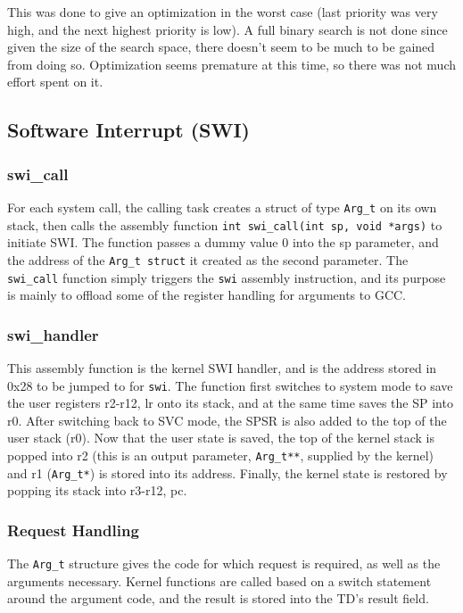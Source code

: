 \documentclass[12pt]{article}
\begin{document}
This was done to give an optimization in the worst case (last priority was very high, and the next highest priority is low). A full binary search is not done since given the size of the search space, there doesn’t seem to be much to be gained from doing so. Optimization seems premature at this time, so there was not much effort spent on it.
\\[1\baselineskip]
\subsection{Software Interrupt (SWI)}
\subsubsection{swi\_call}
For each system call, the calling task creates a struct of type \texttt{Arg\_t} on its own stack, then calls the assembly function \texttt{int swi\_call(int sp, void *args)} to initiate SWI. The function passes a dummy value $0$ into the sp parameter, and the address of the \texttt{Arg\_t struct} it created as the second parameter.  The \texttt{swi\_call} function simply triggers the \texttt{swi} assembly instruction, and its purpose is mainly to offload some of the register handling for arguments to GCC.
\\[1\baselineskip]
\subsubsection{swi\_handler}
This assembly function is the kernel SWI handler, and is the address stored in 0x28 to be jumped to for \texttt{swi}. The function first switches to system mode to save the user registers {r2-r12, lr} onto its stack, and at the same time saves the SP into r0. After switching back to SVC mode, the SPSR is also added to the top of the user stack (r0). Now that the user state is saved, the top of the kernel stack is popped into r2 (this is an output parameter, \texttt{Arg\_t**}, supplied by the kernel) and r1 (\texttt{Arg\_t*}) is stored into its address. Finally, the kernel state is restored by popping its stack into {r3-r12, pc}.
\\[1\baselineskip]
\subsubsection{Request Handling}
The \texttt{Arg\_t} structure gives the code for which request is required, as well as the arguments necessary. Kernel functions are called based on a switch statement around the argument code, and the result is stored into the TD’s result field.
\\[1\baselineskip]
\end{document}

